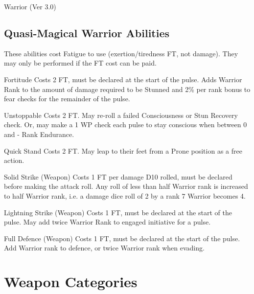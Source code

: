 \begin{Chapter}{Warrior (Ver 3.0)}
\begin{Description}
\end{Description}

\subsection{Quasi-Magical Warrior Abilities}

These abilities cost Fatigue to use (exertion/tiredness FT, not
damage).  They may only be performed if the FT cost can be paid.

\begin{Description}

\item[Fortitude] Costs 2 FT, must be declared at the start of the
  pulse.  Adds Warrior Rank to the amount of damage required to be
  Stunned and 2\% per rank bonus to fear checks for the remainder of
  the pulse.

\item[Unstoppable] Costs 2 FT.  May re-roll a failed Consciousness or
  Stun Recovery check.  Or, may make a 1 \x WP check each pulse to
  stay conscious when between 0 and - Rank Endurance.

\item[Quick Stand] Costs 2 FT.  May leap to their feet from a Prone
  position as a free action.

\item[Solid Strike (Weapon)] Costs 1 FT per damage D10 rolled, must be
  declared before making the attack roll.  Any roll of less than half
  Warrior rank is increased to half Warrior rank, i.e. a damage dice
  roll of 2 by a rank 7 Warrior becomes 4.

\item[Lightning Strike (Weapon)] Costs 1 FT, must be declared at the
  start of the pulse.  May add twice Warrior Rank to engaged
  initiative for a pulse.

\item[Full Defence (Weapon)] Costs 1 FT, must be declared at the start
  of the pulse. Add Warrior rank to defence, or twice Warrior rank
  when evading.

\end{Description}

\begin{table*}
\section{Weapon Categories}

\medskip


\end{table*}
\end{Chapter}
